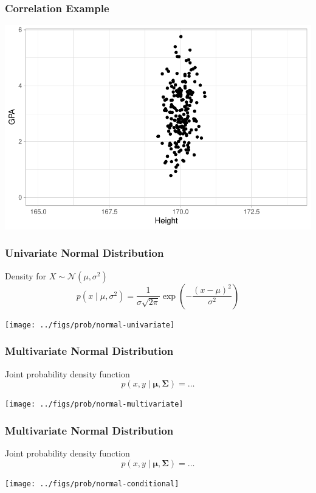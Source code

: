 \documentclass{beamer}
\begin{document}
\begin{frame} \frametitle{Correlation Example}
    \centering
    \includegraphics[width=0.8\linewidth]{../figs/class2/students_example4.pdf} \\[3mm]
\end{frame}


\begin{frame} \frametitle{Univariate Normal Distribution}
  Density for $X \sim \mathcal{N}(\mu , \sigma^2)$
  \[
   p(x \mid  \mu,\sigma^2) = \frac{1}{\sigma \sqrt{2\pi}} \exp \left( - \frac{(x-\mu)^2}{\sigma^2} \right)
 \]
 \begin{center}
   \texttt{[image: ../figs/prob/normal-univariate]}
 \end{center}
\end{frame}

\begin{frame} \frametitle{Multivariate Normal Distribution}
  Joint probability density function
  \[
   p(x, y \mid  \bm{\mu}, \bm{\Sigma}) = \dots  
 \]
 \begin{center}
   \texttt{[image: ../figs/prob/normal-multivariate]}
 \end{center}
\end{frame}

\begin{frame} \frametitle{Multivariate Normal Distribution}
  Joint probability density function
  \[
   p(x, y \mid  \bm{\mu}, \bm{\Sigma}) = \dots  
 \]
 \begin{center}
   \texttt{[image: ../figs/prob/normal-conditional]}
 \end{center}
\end{frame}
\end{document}
